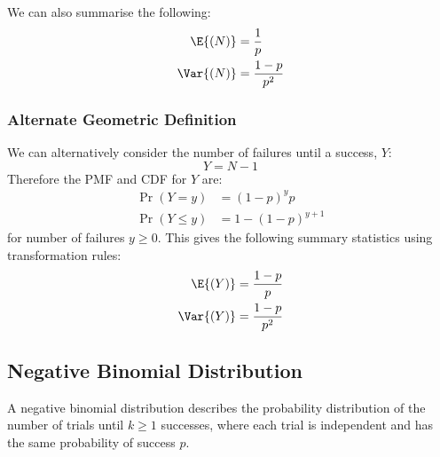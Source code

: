 \documentclass{article}
\begin{document}
\begin{multicols}{3}
    We can also summarise the following:
    \begin{align*}
        \E{\left( N \right)}   & = \frac{1}{p}       \\
        \Var{\left( N \right)} & = \frac{1 - p}{p^2}
    \end{align*}
    \subsubsection{Alternate Geometric Definition}
    We can alternatively consider the number of failures until a success, \(Y\):
    \begin{equation*}
        Y = N - 1
    \end{equation*}
    Therefore the PMF and CDF for \(Y\) are:
    \begin{align*}
        \Pr{\left( Y = y \right)}    & = \left( 1 - p \right)^y p         \\
        \Pr{\left( Y \leq y \right)} & = 1 - \left( 1 - p \right)^{y + 1}
    \end{align*}
    for number of failures \(y \geq 0\). This gives the following summary statistics using
    transformation rules:
    \begin{align*}
        \E{\left( Y \right)}   & = \frac{1 - p}{p}   \\
        \Var{\left( Y \right)} & = \frac{1 - p}{p^2}
    \end{align*}
    \subsection{Negative Binomial Distribution}
    A negative binomial distribution describes the probability distribution of the number of trials until \(k \geq 1\)
    successes, where each trial is independent and has the same probability of success \(p\).


\end{multicols}
\end{document}
